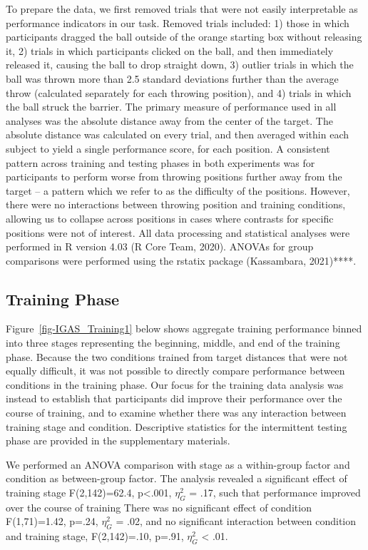 \documentclass[
  12pt,
  letterpaper,
]{article}
\begin{document}
To prepare the data, we first removed trials that were not easily
interpretable as performance indicators in our task. Removed trials
included: 1) those in which participants dragged the ball outside of the
orange starting box without releasing it, 2) trials in which
participants clicked on the ball, and then immediately released it,
causing the ball to drop straight down, 3) outlier trials in which the
ball was thrown more than 2.5 standard deviations further than the
average throw (calculated separately for each throwing position), and 4)
trials in which the ball struck the barrier. The primary measure of
performance used in all analyses was the absolute distance away from the
center of the target. The absolute distance was calculated on every
trial, and then averaged within each subject to yield a single
performance score, for each position. A consistent pattern across
training and testing phases in both experiments was for participants to
perform worse from throwing positions further away from the target -- a
pattern which we refer to as the difficulty of the positions. However,
there were no interactions between throwing position and training
conditions, allowing us to collapse across positions in cases where
contrasts for specific positions were not of interest. All data
processing and statistical analyses were performed in R version 4.03 (R
Core Team, 2020). ANOVAs for group comparisons were performed using the
rstatix package (Kassambara, 2021)****.

\subsection{Training Phase}\label{training-phase}

Figure~\ref{fig-IGAS_Training1} below shows aggregate training
performance binned into three stages representing the beginning, middle,
and end of the training phase. Because the two conditions trained from
target distances that were not equally difficult, it was not possible to
directly compare performance between conditions in the training phase.
Our focus for the training data analysis was instead to establish that
participants did improve their performance over the course of training,
and to examine whether there was any interaction between training stage
and condition. Descriptive statistics for the intermittent testing phase
are provided in the supplementary materials.

We performed an ANOVA comparison with stage as a within-group factor and
condition as between-group factor. The analysis revealed a significant
effect of training stage F(2,142)=62.4, p\textless.001, \(\eta^{2}_G\) =
.17, such that performance improved over the course of training There
was no significant effect of condition F(1,71)=1.42, p=.24,
\(\eta^{2}_G\) = .02, and no significant interaction between condition
and training stage, F(2,142)=.10, p=.91, \(\eta^{2}_G\) \textless{} .01.
\end{document}
